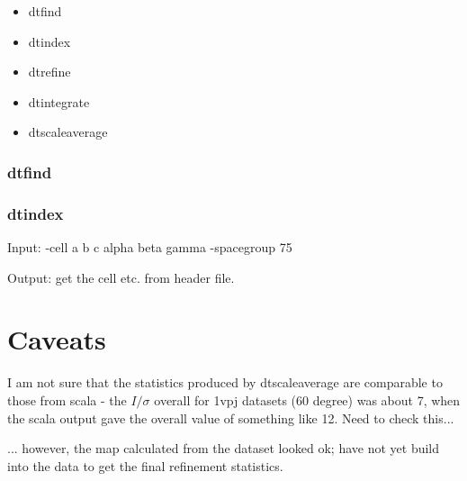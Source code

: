 \documentclass[a4paper, 11pt]{article}
\begin{document}
\begin{itemize}
\item{dtfind}
\item{dtindex}
\item{dtrefine}
\item{dtintegrate}
\item{dtscaleaverage}
\end{itemize}

\subsubsection{dtfind}

\subsubsection{dtindex}


Input: -cell a b c alpha beta gamma -spacegroup 75

Output: get the cell etc. from header file.

\section{Caveats}

I am not sure that the statistics produced by dtscaleaverage are comparable
to those from scala - the $I/\sigma$ overall for 1vpj datasets (60 degree)
was about 7, when the scala output gave the overall value of something like
12. Need to check this...

... however, the map calculated from the dataset looked ok; have not yet 
build into the data to get the final refinement statistics.
\end{document}

